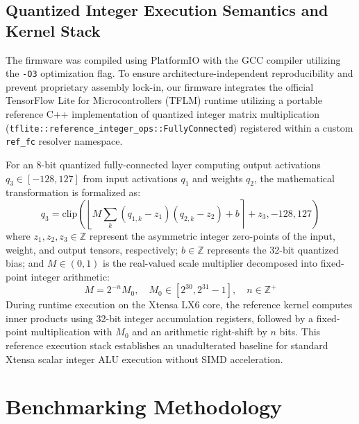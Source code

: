 \documentclass[journal,10pt]{IEEEtran}
\begin{document}
\subsection{Quantized Integer Execution Semantics and Kernel Stack}
The firmware was compiled using PlatformIO with the GCC compiler utilizing the \texttt{-O3} optimization flag. To ensure architecture-independent reproducibility and prevent proprietary assembly lock-in, our firmware integrates the official TensorFlow Lite for Microcontrollers (TFLM) runtime utilizing a portable reference C++ implementation of quantized integer matrix multiplication (\texttt{tflite::reference\_integer\_ops::FullyConnected}) registered within a custom \texttt{ref\_fc} resolver namespace.

For an 8-bit quantized fully-connected layer computing output activations $q_3 \in [-128, 127]$ from input activations $q_1$ and weights $q_2$, the mathematical transformation is formalized as:
\begin{equation}
    q_3 = \text{clip}\left( \left\lfloor M \sum_{k} (q_{1,k} - z_1)(q_{2,k} - z_2) + b \right\rceil + z_3, -128, 127 \right)
\end{equation}
where $z_1, z_2, z_3 \in \mathbb{Z}$ represent the asymmetric integer zero-points of the input, weight, and output tensors, respectively; $b \in \mathbb{Z}$ represents the 32-bit quantized bias; and $M \in (0, 1)$ is the real-valued scale multiplier decomposed into fixed-point integer arithmetic:
\begin{equation}
    M = 2^{-n} M_0, \quad M_0 \in [2^{30}, 2^{31}-1], \quad n \in \mathbb{Z}^+
\end{equation}
During runtime execution on the Xtensa LX6 core, the reference kernel computes inner products using 32-bit integer accumulation registers, followed by a fixed-point multiplication with $M_0$ and an arithmetic right-shift by $n$ bits. This reference execution stack establishes an unadulterated baseline for standard Xtensa scalar integer ALU execution without SIMD acceleration.

\section{Benchmarking Methodology}
\end{document}
